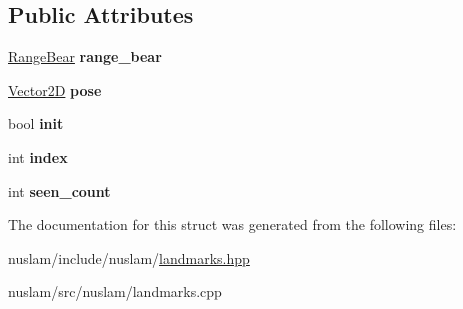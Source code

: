 \subsection*{Public Attributes}
\begin{DoxyCompactItemize}
\item 
\mbox{\label{structnuslam_1_1Point_a9d15c2114308b18dc09d02ea937a49b4}} 
\hyperlink{structnuslam_1_1RangeBear}{Range\+Bear} {\bfseries range\+\_\+bear}
\item 
\mbox{\label{structnuslam_1_1Point_ae1b635297f9325be42073330bb84e313}} 
\hyperlink{structrigid2d_1_1Vector2D}{Vector2D} {\bfseries pose}
\item 
\mbox{\label{structnuslam_1_1Point_a11054da1181cccdae3641decfa504e42}} 
bool {\bfseries init}
\item 
\mbox{\label{structnuslam_1_1Point_ac98cd6504662abd30438dd3c7d04c6f9}} 
int {\bfseries index}
\item 
\mbox{\label{structnuslam_1_1Point_a18c00024a973264ab5cad5c43fcd5bfc}} 
int {\bfseries seen\+\_\+count}
\end{DoxyCompactItemize}


The documentation for this struct was generated from the following files\+:\begin{DoxyCompactItemize}
\item 
nuslam/include/nuslam/\hyperlink{landmarks_8hpp}{landmarks.\+hpp}\item 
nuslam/src/nuslam/landmarks.\+cpp\end{DoxyCompactItemize}

